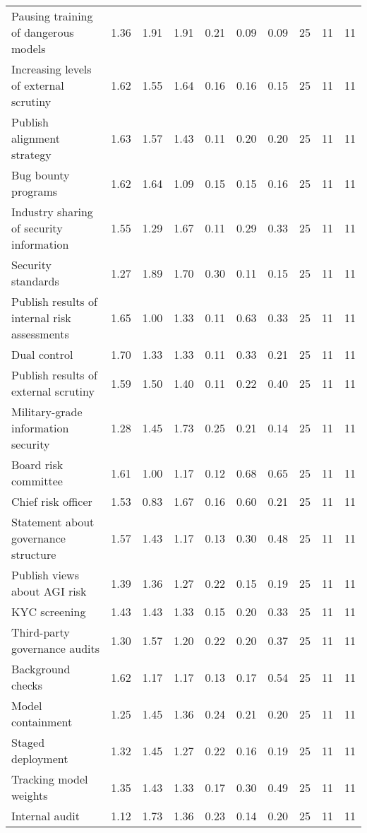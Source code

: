 \documentclass{article}
\begin{document}
\begin{sidewaystable}
\begin{tabular}{l*{9}{r}}
Pausing training of dangerous models & 1.36 & 1.91 & 1.91 & 0.21 & 0.09 & 0.09 & 25 & 11 & 11 \\
Increasing levels of external scrutiny & 1.62 & 1.55 & 1.64 & 0.16 & 0.16 & 0.15 & 25 & 11 & 11 \\
Publish alignment strategy & 1.63 & 1.57 & 1.43 & 0.11 & 0.20 & 0.20 & 25 & 11 & 11 \\
Bug bounty programs & 1.62 & 1.64 & 1.09 & 0.15 & 0.15 & 0.16 & 25 & 11 & 11 \\
Industry sharing of security information & 1.55 & 1.29 & 1.67 & 0.11 & 0.29 & 0.33 & 25 & 11 & 11 \\
Security standards & 1.27 & 1.89 & 1.70 & 0.30 & 0.11 & 0.15 & 25 & 11 & 11 \\
Publish results of internal risk assessments & 1.65 & 1.00 & 1.33 & 0.11 & 0.63 & 0.33 & 25 & 11 & 11 \\
Dual control & 1.70 & 1.33 & 1.33 & 0.11 & 0.33 & 0.21 & 25 & 11 & 11 \\
Publish results of external scrutiny & 1.59 & 1.50 & 1.40 & 0.11 & 0.22 & 0.40 & 25 & 11 & 11 \\
Military-grade information security & 1.28 & 1.45 & 1.73 & 0.25 & 0.21 & 0.14 & 25 & 11 & 11 \\
Board risk committee & 1.61 & 1.00 & 1.17 & 0.12 & 0.68 & 0.65 & 25 & 11 & 11 \\
Chief risk officer & 1.53 & 0.83 & 1.67 & 0.16 & 0.60 & 0.21 & 25 & 11 & 11 \\
Statement about governance structure & 1.57 & 1.43 & 1.17 & 0.13 & 0.30 & 0.48 & 25 & 11 & 11 \\
Publish views about AGI risk & 1.39 & 1.36 & 1.27 & 0.22 & 0.15 & 0.19 & 25 & 11 & 11 \\
KYC screening & 1.43 & 1.43 & 1.33 & 0.15 & 0.20 & 0.33 & 25 & 11 & 11 \\
Third-party governance audits & 1.30 & 1.57 & 1.20 & 0.22 & 0.20 & 0.37 & 25 & 11 & 11 \\
Background checks & 1.62 & 1.17 & 1.17 & 0.13 & 0.17 & 0.54 & 25 & 11 & 11 \\
Model containment & 1.25 & 1.45 & 1.36 & 0.24 & 0.21 & 0.20 & 25 & 11 & 11 \\
Staged deployment & 1.32 & 1.45 & 1.27 & 0.22 & 0.16 & 0.19 & 25 & 11 & 11 \\
Tracking model weights & 1.35 & 1.43 & 1.33 & 0.17 & 0.30 & 0.49 & 25 & 11 & 11 \\
Internal audit & 1.12 & 1.73 & 1.36 & 0.23 & 0.14 & 0.20 & 25 & 11 & 11 \\

\end{tabular}
\end{sidewaystable}
\end{document}
